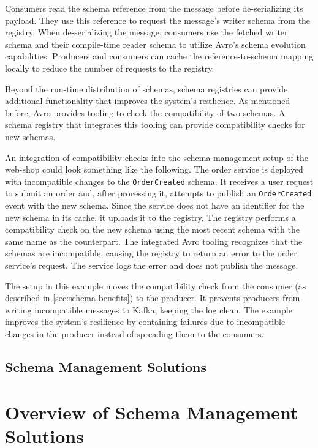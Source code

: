 Consumers read the schema reference from the message before de-serializing its payload.
They use this reference to request the message's writer schema from the registry.
When de-serializing the message, consumers use the fetched writer schema and their compile-time reader schema to utilize Avro's schema evolution capabilities.
Producers and consumers can cache the reference-to-schema mapping locally to reduce the number of requests to the registry.

Beyond the run-time distribution of schemas, schema registries can provide additional functionality that improves the system's resilience.
As mentioned before, Avro provides tooling to check the compatibility of two schemas.
A schema registry that integrates this tooling can provide compatibility checks for new schemas.

An integration of compatibility checks into the schema management setup of the web-shop could look something like the following.
The order service is deployed with incompatible changes to the \texttt{OrderCreated} schema.
It receives a user request to submit an order and, after processing it, attempts to publish an \texttt{OrderCreated} event with the new schema.
Since the service does not have an identifier for the new schema in its cache, it uploads it to the registry.
The registry performs a compatibility check on the new schema using the most recent schema with the same name as the counterpart.
The integrated Avro tooling recognizes that the schemas are incompatible, causing the registry to return an error to the order service's request.
The service logs the error and does not publish the message.

The setup in this example moves the compatibility check from the consumer (as described in \ref{sec:schema-benefits}) to the producer.
It prevents producers from writing incompatible messages to Kafka, keeping the log clean.
The example improves the system's resilience by containing failures due to incompatible changes in the producer instead of spreading them to the consumers.




\subsection{Schema Management Solutions}

\section{Overview of Schema Management Solutions}
